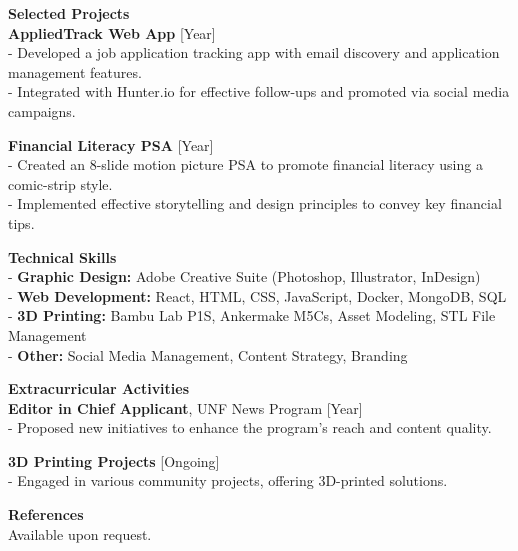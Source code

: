 \documentclass[10pt]{article}
\begin{document}
\vspace{0.5cm}

\textbf{Selected Projects} \\
\textbf{AppliedTrack Web App} \hfill [Year] \\
- Developed a job application tracking app with email discovery and application management features. \\
- Integrated with Hunter.io for effective follow-ups and promoted via social media campaigns.

\textbf{Financial Literacy PSA} \hfill [Year] \\
- Created an 8-slide motion picture PSA to promote financial literacy using a comic-strip style. \\
- Implemented effective storytelling and design principles to convey key financial tips.

\vspace{0.5cm}

\textbf{Technical Skills} \\
- \textbf{Graphic Design:} Adobe Creative Suite (Photoshop, Illustrator, InDesign) \\
- \textbf{Web Development:} React, HTML, CSS, JavaScript, Docker, MongoDB, SQL \\
- \textbf{3D Printing:} Bambu Lab P1S, Ankermake M5Cs, Asset Modeling, STL File Management \\
- \textbf{Other:} Social Media Management, Content Strategy, Branding

\vspace{0.5cm}

\textbf{Extracurricular Activities} \\
\textbf{Editor in Chief Applicant}, UNF News Program \hfill [Year] \\
- Proposed new initiatives to enhance the program’s reach and content quality.

\textbf{3D Printing Projects} \hfill [Ongoing] \\
- Engaged in various community projects, offering 3D-printed solutions.

\vspace{0.5cm}

\textbf{References} \\
Available upon request.
\end{document}
